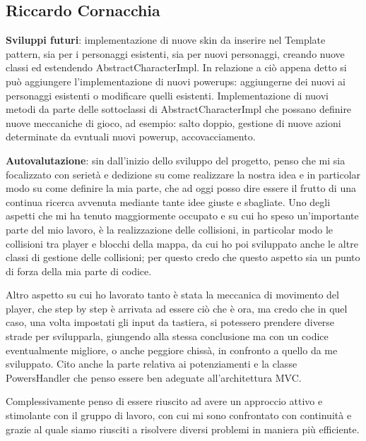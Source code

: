 \documentclass[a4paper,12pt]{report}
\begin{document}
\subsection{Riccardo Cornacchia}
\textbf{Sviluppi futuri}: implementazione di nuove skin da inserire nel Template pattern, sia per i personaggi esistenti, sia per 
nuovi personaggi, creando nuove classi ed estendendo AbstractCharacterImpl.
In relazione a ciò appena detto si può aggiungere l'implementazione di nuovi powerups: aggiungerne dei nuovi ai personaggi esistenti o 
modificare quelli esistenti.
Implementazione di nuovi metodi da parte delle sottoclassi di AbstractCharacterImpl che possano definire nuove meccaniche di gioco, 
ad esempio: salto doppio, gestione di nuove azioni determinate da evntuali nuovi powerup, accovacciamento.

\textbf{Autovalutazione}: sin dall'inizio dello sviluppo del progetto, penso che mi sia focalizzato con serietà e dedizione su come 
realizzare la nostra idea e in particolar modo su come definire la mia parte, che ad oggi posso dire essere il frutto di una continua 
ricerca avvenuta mediante tante idee giuste e sbagliate.
Uno degli aspetti che mi ha tenuto maggiormente occupato e su cui ho speso un'importante parte del mio lavoro, è la realizzazione 
delle collisioni, in particolar modo le collisioni tra player e blocchi della mappa, da cui ho 
poi sviluppato anche le altre classi di gestione delle collisioni; per questo credo che questo aspetto sia un punto di forza della 
mia parte di codice.

Altro aspetto su cui ho lavorato tanto è stata la meccanica di movimento del player, che step by step è arrivata ad essere ciò che è 
ora, ma credo che in quel caso, una volta impostati gli input da tastiera, si potessero prendere diverse strade per svilupparla, 
giungendo alla stessa conclusione ma con un codice eventualmente migliore, o anche peggiore chissà, in confronto a quello da me sviluppato.
Cito anche la parte relativa ai potenziamenti e la classe PowersHandler che penso essere ben adeguate all'architettura MVC.

Complessivamente penso di essere riuscito ad avere un approccio attivo e stimolante con il gruppo di lavoro, con cui mi sono confrontato 
con continuità e grazie al quale siamo riusciti a risolvere diversi problemi in maniera più efficiente.
\end{document}
